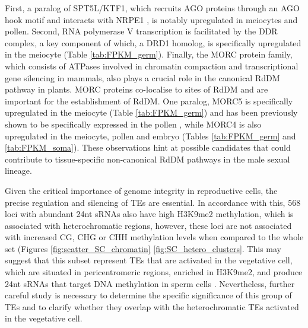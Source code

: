  First, a paralog of SPT5L/KTF1, which recruits AGO proteins through an AGO hook motif \cite{RN121,RN273}  and interacts with NRPE1 \cite{RN271,RN272}, is notably upregulated in meiocytes and pollen. Second, RNA polymerase V transcription is facilitated by the DDR complex, a key component of which, a DRD1 homolog, is specifically upregulated in the meiocyte (Table \ref{tab:FPKM_germ}). Finally, the MORC protein family, which consists of ATPases involved in chromatin compaction and transcriptional gene silencing in mammals, also plays a crucial role in the canonical RdDM pathway in plants. MORC proteins co-localise to sites of RdDM and are important for the establishment of RdDM. One paralog, MORC5 is specifically upregulated in the meiocyte (Table \ref{tab:FPKM_germ}) and has been previously shown to be specifically expressed in the pollen \cite{RN274}, while MORC4 is also upregulated in the meiocyte, pollen and embryo (Tables \ref{tab:FPKM_germ} and \ref{tab:FPKM_soma}). These observations hint at possible candidates that could contribute to tissue-specific non-canonical RdDM pathways in the male sexual lineage.

Given the critical importance of genome integrity in reproductive cells, the precise regulation and silencing of TEs are essential. In accordance with this, 568 loci with abundant 24nt sRNAs also have high H3K9me2 methylation, which is associated with heterochromatic regions, however, these loci are not associated with increased CG, CHG or CHH methylation levels when compared to the whole set (Figures \ref{fig:scatter_SC_chromatin} \ref{fig:SC_hetero_clusters}. This may suggest that this subset represent TEs that are activated in the vegetative cell, which are situated in pericentromeric regions, enriched in H3K9me2, and produce 24nt sRNAs that target DNA methylation in sperm cells \cite{RN278}. Nevertheless, further careful study is necessary to determine the specific significance of this group of TEs and to clarify whether they overlap with the heterochromatic TEs activated in the vegetative cell.


